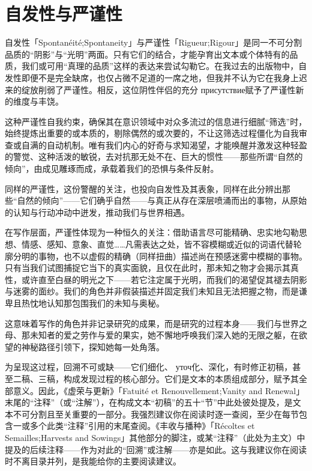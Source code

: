 \section{自发性与严谨性}

自发性「Spontanéité;Spontaneity」与严谨性「Rigueur;Rigour」是同一不可分割品质的“阴影”与“光明”两面。只有它们的结合，才能孕育出文本或个体特有的品质，我们或可用“真理的品质”这样的表达来尝试勾勒它。在我过去的出版物中，自发性即便不是完全缺席，也仅占微不足道的一席之地，但我并不认为它在我身上迟来的绽放削弱了严谨性。相反，这位阴性伴侣的充分 присутствие赋予了严谨性新的维度与丰饶。

这种严谨性自我约束，确保其在意识领域中对众多流过的信息进行细腻“筛选”时，始终提炼出重要的或本质的，剔除偶然的或次要的，不让这筛选过程僵化为自我审查或自满的自动机制。唯有我们内心的好奇与求知渴望，才能唤醒并激发这种轻盈的警觉、这种活泼的敏锐，去对抗那无处不在、巨大的惯性——那些所谓“自然的倾向”，由成见雕琢而成，承载着我们的恐惧与条件反射。

同样的严谨性，这份警醒的关注，也投向自发性及其表象，同样在此分辨出那些“自然的倾向”——它们确乎自然——与真正从存在深层喷涌而出的事物，从原始的认知与行动冲动中迸发，推动我们与世界相遇。

在写作层面，严谨性体现为一种恒久的关注：借助语言尽可能精确、忠实地勾勒思想、情感、感知、意象、直觉……凡需表达之处，皆不容模糊或近似的词语代替轮廓分明的事物，也不以虚假的精确（同样扭曲）描述尚在预感迷雾中模糊的事物。只有当我们试图捕捉它当下的真实面貌，且仅在此时，那未知之物才会揭示其真性，或许直至白昼的明光之下——若它注定属于光明，而我们的渴望促其褪去阴影与迷雾的面纱。我们的角色并非假装描述并固定我们未知且无法把握之物，而是谦卑且热忱地认知那包围我们的未知与奥秘。

这意味着写作的角色并非记录研究的成果，而是研究的过程本身——我们与世界之母、那未知者的爱之劳作与爱的果实，她不懈地呼唤我们深入她的无限之躯，在欲望的神秘路径引领下，探知她每一处角落。

为呈现这过程，回溯不可或缺——它们细化、 уточ化、深化，有时修正初稿，甚至二稿、三稿，构成发现过程的核心部分。它们是文本的本质组成部分，赋予其全部意义。因此，《虚荣与更新》「Fatuité et Renouvellement;Vanity and Renewal」末尾的“注释”（或“注解”），在构成文本“初稿”的五十“节”中此处彼处提及，是文本不可分割且至关重要的一部分。我强烈建议你在阅读时逐一查阅，至少在每节包含一或多个此类“注释”引用的末尾查阅。《丰收与播种》「Récoltes et Semailles;Harvests and Sowings」其他部分的脚注，或某“注释”（此处为主文）中提及的后续注释——作为对此的“回溯”或注解——亦是如此。这与我建议你在阅读时不离目录并列，是我能给你的主要阅读建议。

